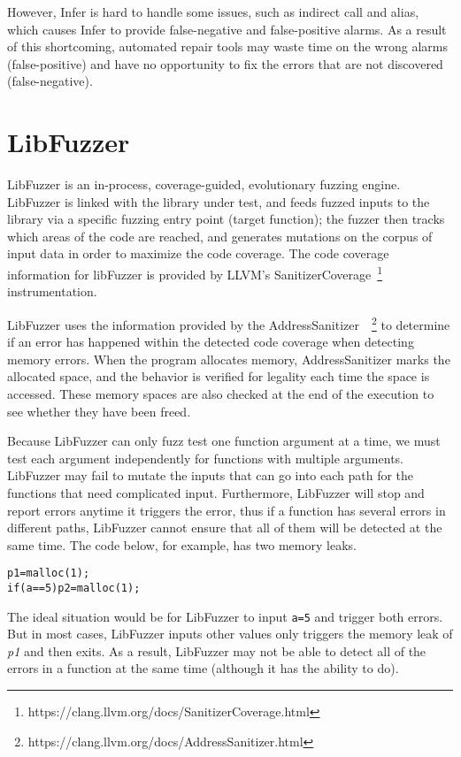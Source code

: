 \documentclass[a4paper,11pt,oneside,openany]{book}
\begin{document}
However, Infer is hard to handle some issues, such as indirect call and alias, which causes Infer to provide false-negative and false-positive alarms. As a result of this shortcoming, automated repair tools may waste time on the wrong alarms (false-positive) and have no opportunity to fix the errors that are not discovered (false-negative).


\section{LibFuzzer}
LibFuzzer is an in-process, coverage-guided, evolutionary fuzzing engine. LibFuzzer is linked with the library under test, and feeds fuzzed inputs to the library via a specific fuzzing entry point (target function); the fuzzer then tracks which areas of the code are reached, and generates mutations on the corpus of input data in order to maximize the code coverage. The code coverage information for libFuzzer is provided by LLVM's SanitizerCoverage~\footnote{https://clang.llvm.org/docs/SanitizerCoverage.html} instrumentation.


LibFuzzer uses the information provided by the AddressSanitizer~\cite{asan}~\footnote{https://clang.llvm.org/docs/AddressSanitizer.html} to determine if an error has happened within the detected code coverage when detecting memory errors. When the program allocates memory, AddressSanitizer marks the allocated space, and the behavior is verified for legality each time the space is accessed. These memory spaces are also checked at the end of the execution to see whether they have been freed.



Because LibFuzzer can only fuzz test one function argument at a time, we must test each argument independently for functions with multiple arguments. LibFuzzer may fail to mutate the inputs that can go into each path for the functions that need complicated input. Furthermore, LibFuzzer will stop and report errors anytime it triggers the error, thus if a function has several errors in different paths, LibFuzzer cannot ensure that all of them will be detected at the same time. The code below, for example, has two memory leaks. 


\begin{minipage}{\textwidth}
    \vspace{0.2cm}
    \hspace{0.3cm}\verb|p1=malloc(1);|\\\hspace{0.3cm}\verb|if(a==5)p2=malloc(1);|\\
\end{minipage}
The ideal situation would be for LibFuzzer to input \verb|a=5| and trigger both errors. But in most cases,  LibFuzzer inputs other values only triggers the memory leak of {\it p1} and then exits. As a result, LibFuzzer may not be able to detect all of the errors in a function at the same time (although it has the ability to do).
\end{document}
